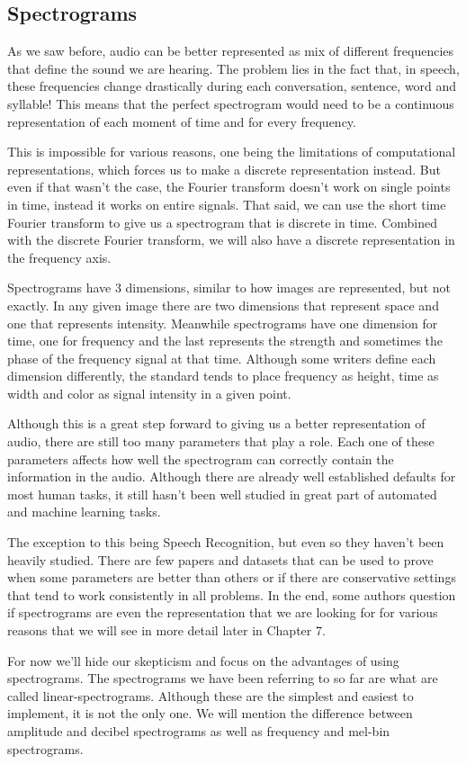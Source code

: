 \documentclass{book}
\begin{document}
\begin{appendices}
\chapter{Spectrograms}
\qquad As we saw before, audio can be better represented as mix of different frequencies that define the sound we are hearing.
The problem lies in the fact that, in speech, these frequencies change drastically during each conversation, sentence, word and syllable!
This means that the perfect spectrogram would need to be a continuous representation of each moment of time and for every frequency.
\par
This is impossible for various reasons, one being the limitations of computational representations, which forces us to make a discrete representation instead.
But even if that wasn’t the case, the Fourier transform doesn’t work on single points in time, instead it works on entire signals.
That said, we can use the short time Fourier transform to give us a spectrogram that is discrete in time.
Combined with the discrete Fourier transform, we will also have a discrete representation in the frequency axis.
\par
Spectrograms have 3 dimensions, similar to how images are represented, but not exactly.
In any given image there are two dimensions that represent space and one that represents intensity.
Meanwhile spectrograms have one dimension for time, one for frequency and the last represents the strength and sometimes the phase of the frequency signal at that time.
Although some writers define each dimension differently, the standard tends to place frequency as height, time as width and color as signal intensity in a given point.
\par
Although this is a great step forward to giving us a better representation of audio, there are still too many parameters that play a role.
Each one of these parameters affects how well the spectrogram can correctly contain the information in the audio.
Although there are already well established defaults for most human tasks, it still hasn’t been well studied in great part of automated and machine learning tasks.
\par
The exception to this being Speech Recognition, but even so they haven’t been heavily studied.
There are few papers and datasets that can be used to prove when some parameters are better than others or if there are conservative settings that tend to work consistently in all problems.
In the end, some authors question if spectrograms are even the representation that we are looking for for various reasons that we will see in more detail later in Chapter 7.
\par
For now we'll hide our skepticism and focus on the advantages of using spectrograms.
The spectrograms we have been referring to so far are what are called linear-spectrograms.
Although these are the simplest and easiest to implement, it is not the only one.
We will mention the difference between amplitude and decibel spectrograms as well as frequency and mel-bin spectrograms.

\end{appendices}
\end{document}

